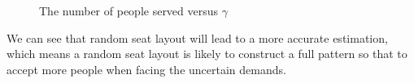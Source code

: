 \begin{figure}[ht]
  \centering
  \caption{The number of people served versus $\gamma$}
\end{figure}

We can see that random seat layout will lead to a more accurate estimation, which means a random seat layout is likely to construct a full pattern so that to accept more people when facing the uncertain demands.

\newpage









